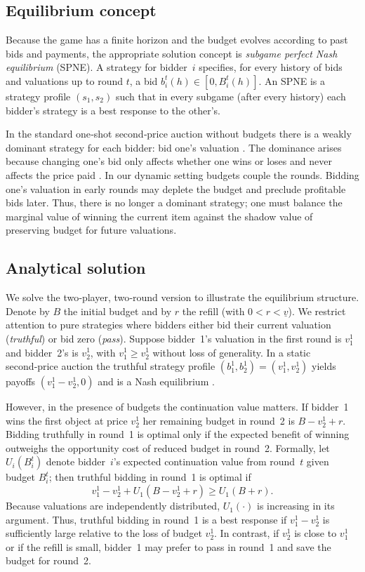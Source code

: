 \subsection{Equilibrium concept}
Because the game has a finite horizon and the budget evolves according to past bids and payments, the appropriate solution concept is \emph{subgame perfect Nash equilibrium} (SPNE).  A strategy for bidder~\(i\) specifies, for every history of bids and valuations up to round \(t\), a bid \(b_i^t(h)\in [0,B_i^t(h)]\).  An SPNE is a strategy profile \((s_1,s_2)\) such that in every subgame (after every history) each bidder’s strategy is a best response to the other’s.

In the standard one‑shot second‑price auction without budgets there is a weakly dominant strategy for each bidder: bid one’s valuation \parencite{SpirakisAuctionsSlides}.  The dominance arises because changing one’s bid only affects whether one wins or loses and never affects the price paid \parencite{SpirakisAuctionsSlides}.
In our dynamic setting budgets couple the rounds.  Bidding one’s valuation in early rounds may deplete the budget and preclude profitable bids later.  Thus, there is no longer a dominant strategy; one must balance the marginal value of winning the current item against the shadow value of preserving budget for future valuations.

\subsection{Analytical solution}

We solve the two‑player, two‑round version to illustrate the equilibrium structure.  Denote by \(B\) the initial budget and by \(r\) the refill (with \(0<r<\underline{v}\)).  We restrict attention to pure strategies where bidders either bid their current valuation (\emph{truthful}) or bid zero (\emph{pass}).  Suppose bidder~1’s valuation in the first round is \(v_1^1\) and bidder~2’s is \(v_2^1\), with \(v_1^1\ge v_2^1\) without loss of generality.  In a static second‑price auction the truthful strategy profile \((b_1^1,b_2^1)=(v_1^1,v_2^1)\) yields payoffs \((v_1^1 - v_2^1,0)\) and is a Nash equilibrium \parencite{SpirakisAuctionsSlides}.

However, in the presence of budgets the continuation value matters.  If bidder~1 wins the first object at price \(v_2^1\) her remaining budget in round~2 is \(B - v_2^1 + r\).  Bidding truthfully in round~1 is optimal only if the expected benefit of winning outweighs the opportunity cost of reduced budget in round~2.  Formally, let \(U_i(B_i^t)\) denote bidder~\(i\)’s expected continuation value from round~\(t\) given budget \(B_i^t\); then truthful bidding in round~1 is optimal if
\[
v_1^1 - v_2^1 + U_1(B - v_2^1 + r) \ge U_1(B + r).
\]
Because valuations are independently distributed, \(U_1(\cdot)\) is increasing in its argument.  Thus, truthful bidding in round~1 is a best response if \(v_1^1 - v_2^1\) is sufficiently large relative to the loss of budget \(v_2^1\).  In contrast, if \(v_2^1\) is close to \(v_1^1\) or if the refill is small, bidder~1 may prefer to pass in round~1 and save the budget for round~2.

